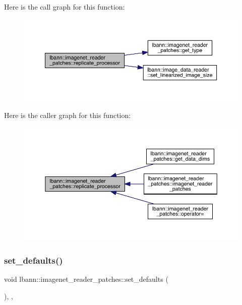 Here is the call graph for this function\+:\nopagebreak
\begin{figure}[H]
\begin{center}
\leavevmode
\includegraphics[width=350pt]{classlbann_1_1imagenet__reader__patches_a714247cc547161688a66a64737527de0_cgraph}
\end{center}
\end{figure}
Here is the caller graph for this function\+:\nopagebreak
\begin{figure}[H]
\begin{center}
\leavevmode
\includegraphics[width=350pt]{classlbann_1_1imagenet__reader__patches_a714247cc547161688a66a64737527de0_icgraph}
\end{center}
\end{figure}
\mbox{\label{classlbann_1_1imagenet__reader__patches_a3458e4274b9ed894973a069cf884f04a}} 
\subsubsection{\texorpdfstring{set\+\_\+defaults()}{set\_defaults()}}
{\footnotesize\ttfamily void lbann\+::imagenet\+\_\+reader\+\_\+patches\+::set\+\_\+defaults (\begin{DoxyParamCaption}{ }\end{DoxyParamCaption})\hspace{0.3cm}{\ttfamily [override]}, {\ttfamily [protected]}, {\ttfamily [virtual]}}



